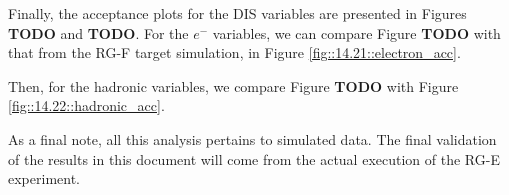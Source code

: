    Finally, the acceptance plots for the DIS variables are presented in Figures \textbf{TODO} and \textbf{TODO}.
    For the $e^-$ variables, we can compare Figure \textbf{TODO} with that from the RG-F target simulation, in Figure \ref{fig::14.21::electron_acc}.

    Then, for the hadronic variables, we compare Figure \textbf{TODO} with Figure \ref{fig::14.22::hadronic_acc}.

    As a final note, all this analysis pertains to simulated data.
    The final validation of the results in this document will come from the actual execution of the RG-E experiment.

